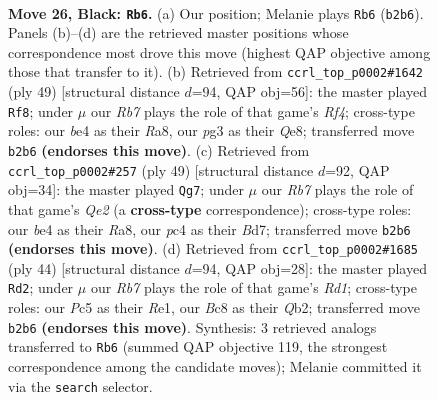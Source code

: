 \documentclass[11pt]{article}
\begin{document}
\clearpage

\begin{figure}[p]\centering
\begin{subfigure}{0.46\textwidth}\centering
\resizebox{\linewidth}{!}{%
\newchessgame
\chessboard[
  setfen={2bq1rk1/p3p1b1/P2p1p2/2p2P2/2P1B1Q1/6P1/1r2N2K/R1B2R2 b - - 1 26},
  showmover=false,
  pgfstyle=straightmove, color=movearrow, markmove={b2-b6}
]}
\caption{}
\end{subfigure}\hfill
\begin{subfigure}{0.46\textwidth}\centering
\resizebox{\linewidth}{!}{%
\newchessgame
\chessboard[
  setfen={r3q3/3bb1pk/p3p2p/3pPr2/3B1P2/3PQRN1/1P5P/R6K b - - 5 25},
  showmover=false,
  pgfstyle=straightmove, color=movearrow, markmove={f5-f8}
]}
\caption{}
\end{subfigure}
\\[4pt]
\begin{subfigure}{0.46\textwidth}\centering
\resizebox{\linewidth}{!}{%
\newchessgame
\chessboard[
  setfen={r4rk1/3bq2p/3bp3/1p1p2B1/pP1P2QP/P7/4PRB1/2R3K1 b - - 0 25},
  showmover=false,
  pgfstyle=straightmove, color=movearrow, markmove={e7-g7}
]}
\caption{}
\end{subfigure}\hfill
\begin{subfigure}{0.46\textwidth}\centering
\resizebox{\linewidth}{!}{%
\newchessgame
\chessboard[
  setfen={3r4/2p2rpk/1p2q1np/3b1p2/8/2B1P2P/PQ3PP1/3RRBK1 w - - 2 23},
  showmover=false,
  pgfstyle=straightmove, color=movearrow, markmove={d1-d2}
]}
\caption{}
\end{subfigure}
\caption{\textbf{Move 26, Black: \texttt{Rb6}.} (a) Our position; Melanie plays \texttt{Rb6} (\texttt{b2b6}). Panels (b)--(d) are the retrieved master positions whose correspondence most drove this move (highest QAP objective among those that transfer to it). (b) Retrieved from \texttt{ccrl\_top\_p0002\#1642} (ply 49) [structural distance $d$=94, QAP obj=56]: the master played \texttt{Rf8}; under $\mu$ our \emph{Rb7} plays the role of that game's \emph{Rf4}; cross-type roles: our \emph{b}e4 as their \emph{R}a8, our \emph{p}g3 as their \emph{Q}e8; transferred move \texttt{b2b6} \textbf{(endorses this move)}. (c) Retrieved from \texttt{ccrl\_top\_p0002\#257} (ply 49) [structural distance $d$=92, QAP obj=34]: the master played \texttt{Qg7}; under $\mu$ our \emph{Rb7} plays the role of that game's \emph{Qe2} (a \textbf{cross-type} correspondence); cross-type roles: our \emph{b}e4 as their \emph{R}a8, our \emph{p}c4 as their \emph{B}d7; transferred move \texttt{b2b6} \textbf{(endorses this move)}. (d) Retrieved from \texttt{ccrl\_top\_p0002\#1685} (ply 44) [structural distance $d$=94, QAP obj=28]: the master played \texttt{Rd2}; under $\mu$ our \emph{Rb7} plays the role of that game's \emph{Rd1}; cross-type roles: our \emph{P}c5 as their \emph{R}e1, our \emph{B}c8 as their \emph{Q}b2; transferred move \texttt{b2b6} \textbf{(endorses this move)}. Synthesis: 3 retrieved analogs transferred to \texttt{Rb6} (summed QAP objective 119, the strongest correspondence among the candidate moves); Melanie committed it via the \texttt{search} selector.}
\label{fig:thought-m51}
\end{figure}
\end{document}
